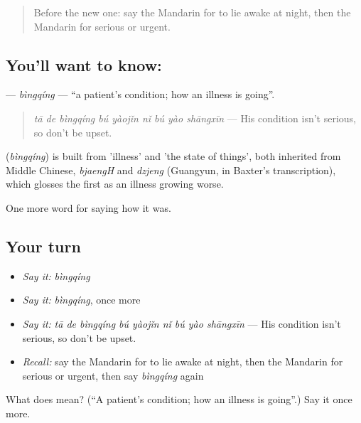 \label{lesson:ZH-C481-bingqing}



\begin{quote}
Before the new one: say the Mandarin for to lie awake at night, then the Mandarin for serious or urgent.
\end{quote}

\subsection*{You'll want to know: }
\textbf{} — \emph{bìngqíng} — \textquotedblleft{}a patient's condition; how an illness is going\textquotedblright{}.

\begin{quote}
\textbf{} \emph{tā de bìngqíng bú yàojǐn nǐ bú yào shāngxīn} — His condition isn't serious, so don't be upset.
\end{quote}

\begin{cousinweb}
\textbf{} (\emph{bìngqíng}) is built from  'illness' and  'the state of things', both inherited from Middle Chinese, \emph{bjaengH} and \emph{dzjeng} (Guangyun, in Baxter's transcription), which glosses the first as an illness growing worse.
\end{cousinweb}

\begin{grammarlens}[title={What you've built}]
One more word for saying how it was.
\end{grammarlens}

\subsection*{Your turn}
\begin{itemize}
\raggedright
  \item \emph{Say it:} \emph{bìngqíng}
  \item \emph{Say it:} \emph{bìngqíng}, once more
  \item \emph{Say it:} \emph{tā de bìngqíng bú yàojǐn nǐ bú yào shāngxīn} — His condition isn't serious, so don't be upset.
  \item \emph{Recall:} say the Mandarin for to lie awake at night, then the Mandarin for serious or urgent, then say \emph{bìngqíng} again
\end{itemize}

\begin{tcolorbox}[breakable,colback=teal!4,colframe=teal!35!black,title={Before you move on}]
What does  mean? (\textquotedblleft{}A patient's condition; how an illness is going\textquotedblright{}.) Say it once more.
\end{tcolorbox}
